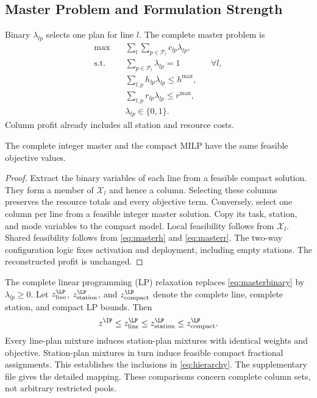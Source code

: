 \subsection{Master Problem and Formulation Strength}
Binary $\lambda_{lp}$ selects one plan for line $l$. The complete master problem is
\begin{align}
\max\quad&\sum_l\sum_{p\in\mathcal P_l}c_{lp}\lambda_{lp},\label{eq:master}\\
\text{s.t.}\quad&\sum_{p\in\mathcal P_l}\lambda_{lp}=1&&\forall l,\label{eq:convex}\\
&\sum_{l,p}h_{lp}\lambda_{lp}\leq h^{\max},\label{eq:masterh}\\
&\sum_{l,p}r_{lp}\lambda_{lp}\leq r^{\max},\label{eq:masterr}\\
&\lambda_{lp}\in\{0,1\}.\label{eq:masterbinary}
\end{align}
Column profit already includes all station and resource costs.

\begin{proposition}\label{prop:equiv}
The complete integer master and the compact MILP have the same feasible objective values.
\end{proposition}
\begin{proof}
Extract the binary variables of each line from a feasible compact solution. They form a member of $\mathcal X_l$ and hence a column. Selecting these columns preserves the resource totals and every objective term. Conversely, select one column per line from a feasible integer master solution. Copy its task, station, and mode variables to the compact model. Local feasibility follows from $\mathcal X_l$. Shared feasibility follows from \eqref{eq:masterh} and \eqref{eq:masterr}. The two-way configuration logic fixes activation and deployment, including empty stations. The reconstructed profit is unchanged.
\end{proof}

The complete linear programming (LP) relaxation replaces \eqref{eq:masterbinary} by $\lambda_{lp}\geq0$. Let $z_{\rm line}^{\LP}$, $z_{\rm station}^{\LP}$, and $z_{\rm compact}^{\LP}$ denote the complete line, complete station, and compact LP bounds. Then
\begin{equation}
z^{\IP}\leq z_{\rm line}^{\LP}\leq z_{\rm station}^{\LP}\leq z_{\rm compact}^{\LP}.\label{eq:hierarchy}
\end{equation}
Every line-plan mixture induces station-plan mixtures with identical weights and objective. Station-plan mixtures in turn induce feasible compact fractional assignments. This establishes the inclusions in \eqref{eq:hierarchy}. The supplementary file gives the detailed mapping. These comparisons concern complete column sets, not arbitrary restricted pools.

